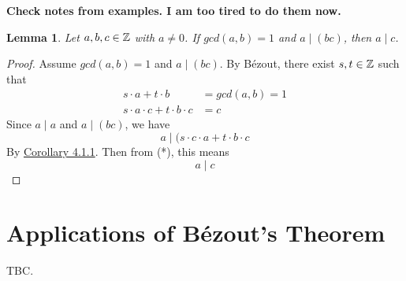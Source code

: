 \documentclass[openany]{report}
\newtheorem{lemma}{Lemma}[section]
\begin{document}
\textbf{Check notes from examples. I am too tired to do them now.}
\begin{lemma}\label{lemma6.0.2}
    Let $a,b,c \in \mathbb{Z}$ with $a \neq 0$. If $gcd(a,b) = 1$ and $a \mid (bc)$, then $a \mid c$.
\end{lemma}
\begin{proof}
    Assume $gcd(a,b) = 1$ and $a \mid (bc)$. By B\'ezout, there exist $s,t \in \mathbb{Z}$ such that 
    \begin{align*}
        s \cdot a + t \cdot b &= gcd(a,b) = 1\\
        s \cdot a \cdot c + t \cdot b \cdot c &= c\tag{*}
    \end{align*}
    Since $a \mid a$ and $a \mid (bc)$, we have 
    $$a \mid (s \cdot c \cdot a + t \cdot b \cdot c$$
    By \hyperref[corollary4.1.1]{Corollary 4.1.1}. Then from (*), this means 
    $$a \mid c$$
\end{proof}
\chapter{Applications of B\'ezout's Theorem}
TBC. 
\end{document}
